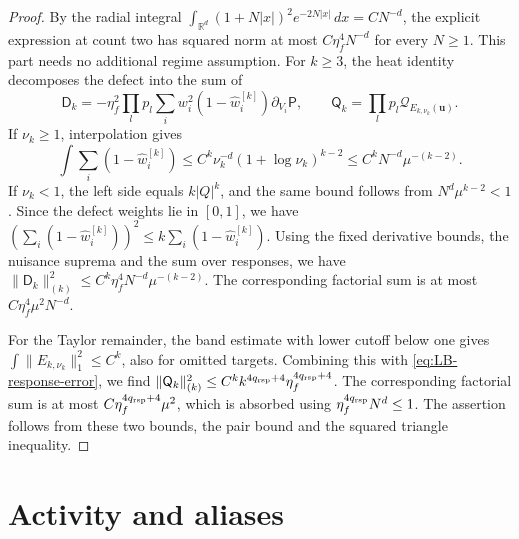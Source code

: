 \begin{proof}
By the radial integral
$\int_{\mathbb R^d}(1+N|x|)^2e^{-2N|x|}\,dx=CN^{-d}$, the explicit
expression at count two has squared norm at most $C\eta_f^4N^{-d}$ for every
$N\ge1$. This part needs no additional regime assumption.
For $k\ge3$, the heat identity decomposes the defect into the sum of
\[
 \mathsf D_k=-\eta_f^2\prod_lp_l\sum_iw_i^2
 (1-\widehat w_i^{[k]})\partial_{V_i}\mathsf P,\qquad
 \mathsf Q_k=\prod_lp_l\mathcal Q_{E_{k,\nu_k}(\mathbf u)}.
\]
If $\nu_k\ge1$, interpolation gives
\[
 \int\sum_i(1-\widehat w_i^{[k]})
 \le C^k\nu_k^{-d}(1+\log\nu_k)^{k-2}
 \le C^kN^{-d}\mu^{-(k-2)}.
\]
If $\nu_k<1$, the left side equals $k|Q|^k$, and the same bound
follows from $N^d\mu^{k-2}<1$. Since the defect weights lie in $[0,1]$,
we have
$(\sum_i(1-\widehat w_i^{[k]}))^2\le k\sum_i(1-\widehat w_i^{[k]})$.
Using the fixed derivative bounds, the nuisance suprema and the sum over
responses, we have
$\|\mathsf D_k\|_{(k)}^2\le C^k\eta_f^4N^{-d}\mu^{-(k-2)}$.
The corresponding factorial sum is at most $C\eta_f^4\mu^2N^{-d}$.

For the Taylor remainder, the band estimate with lower cutoff below one
gives $\int\|E_{k,\nu_k}\|_1^2\le C^k$, also for omitted targets.
Combining this with \eqref{eq:LB-response-error}, we find
$\|\mathsf Q_k\|_{(k)}^2\le C^k k^{4q_{\rm rsp}+4}
\eta_f^{4q_{\rm rsp}+4}$. The corresponding factorial sum is at most
$C\eta_f^{4q_{\rm rsp}+4}\mu^2$, which is absorbed using
$\eta_f^{4q_{\rm rsp}}N^d\le1$. The assertion follows from these two
bounds, the pair bound and the squared triangle inequality.
\end{proof}
\section{Activity and aliases}\label{sec:LB-alias}

